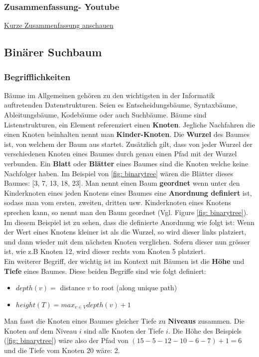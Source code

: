 \documentclass[a4paper]{article}
\begin{document}
\subsubsection*{Zusammenfassung- Youtube}
\href{https://www.youtube.com/watch?v=0wPlzMU-k00}{Kurze Zusammenfassung anschauen}

\subsection{Binärer Suchbaum}
\subsubsection{Begrifflichkeiten}
Bäume im Allgemeinen gehören zu den wichtigsten in der Informatik auftretenden Datenstrukturen. Seien es Entscheidungsbäume, Syntaxbäume, Ableitungsbäume, Kodebäume oder auch Suchbäume. Bäume sind Listenstrukturen, ein Element referenziert einen \textbf{Knoten}. Jegliche Nachfahren die einen Knoten beinhalten nennt man \textbf{Kinder-Knoten}. Die \textbf{Wurzel} des Baumes ist, von welchem der Baum aus startet. Zusätzlich gilt, dass von jeder Wurzel der verschiedenen Knoten eines Baumes durch genau einen Pfad mit der Wurzel verbunden. Ein \textbf{Blatt} oder \textbf{Blätter} eines Baumes sind die Knoten welche keine Nachfolger haben. Im Beispiel von \ref{fig: binarytree} wären die Blätter dieses Baumes: [3, 7, 13, 18, 23]. Man nennt einen Baum \textbf{geordnet} wenn unter den Kinderknoten eines jeden Knotens eines Baumes eine \textbf{Anordnung definiert} ist, sodass man vom ersten, zweiten, dritten usw. Kinderknoten eines Knotens sprechen kann, so nennt man den Baum geordnet (Vgl. Figure \ref{fig: binarytree}). Im diesem Beispiel ist zu sehen, dass die definierte Anordnung wie folgt ist: Wenn der Wert eines Knotens kleiner ist als die Wurzel, so wird dieser links platziert, und dann wieder mit dem nächsten Knoten verglichen. Sofern dieser nun grösser ist, wie z.B Knoten 12, wird dieser rechts vom Knoten 5 platziert. \\
Ein weiterer Begriff, der wichtig ist im Kontext mit Bäumen ist die \textbf{Höhe} und \textbf{Tiefe} eines Baumes. Diese beiden Begriffe sind wie folgt definiert: 
\begin{itemize}
    \item $depth(v) = $ distance $v$ to root (along unique path)
    \item $height(T) = max_{v \in V} depth(v) + 1$
\end{itemize}
Man fasst die Knoten eines Baumes gleicher Tiefe zu \textbf{Niveaus} zusammen. Die Knoten auf dem Niveau $i$ sind alle Knoten der Tiefe $i$. Die Höhe des Beispiels (\ref{fig: binarytree}) wäre also der Pfad von $(15-5-12-10-6-7) + 1 = 6 $ und die Tiefe vom Knoten 20 wäre: 2. \\
\end{document}
